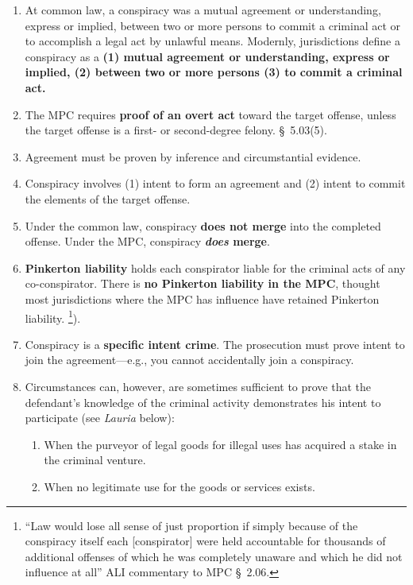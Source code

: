 \begin{enumerate}
    \item At common law, a conspiracy was a mutual agreement or understanding, 
    express or implied, between two or more persons to commit a criminal act 
    or to accomplish a legal act by unlawful means.  Modernly, jurisdictions 
    define a conspiracy as a \textbf{(1) mutual agreement or understanding, 
    express or implied, (2) between two or more persons (3) to commit a 
    criminal act.}
    \item The MPC requires \textbf{proof of an overt act} toward the target 
    offense, unless the target offense is a first- or second-degree felony. \S\ 
    5.03(5).
    \item Agreement must be proven by inference and circumstantial evidence.
    \item Conspiracy involves (1) intent to form an agreement and (2) intent 
    to commit the elements of the target offense.
    \item Under the common law, conspiracy \textbf{does not merge} into the 
    completed offense. Under the MPC, conspiracy \textbf{\emph{does} merge}.
    \item \textbf{Pinkerton liability} holds each conspirator liable for the 
    criminal acts of any co-conspirator. There is \textbf{no Pinkerton 
    liability in the MPC}, thought most jurisdictions where the MPC has 
    influence have retained Pinkerton liability. \footnote{``Law would lose all sense of just proportion if 
    simply because of the conspiracy itself each [conspirator] were held 
    accountable for thousands of additional offenses of which he was 
    completely unaware and which he did not influence at all'' ALI 
    commentary to MPC \S\ 2.06.}).
    \item Conspiracy is a \textbf{specific intent crime}. The prosecution must 
    prove intent to join the agreement---e.g., you cannot accidentally join a 
    conspiracy.
    \item Circumstances can, however, are sometimes sufficient to prove that 
    the defendant's knowledge of the criminal activity demonstrates his intent 
    to participate (see \emph{Lauria} below):
    \begin{enumerate}
        \item When the purveyor of legal goods for illegal uses has acquired a 
        stake in the criminal venture.
        \item When no legitimate use for the goods or services exists.

\end{enumerate}
\end{enumerate}
